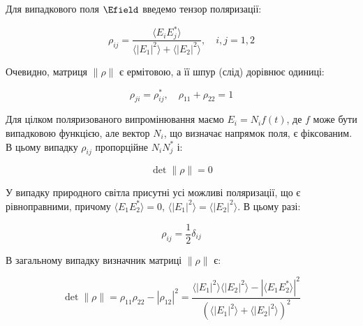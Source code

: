 Для випадкового поля \(\Efield\) введемо тензор поляризації:

\begin{equation}
	\rho_{ij} = \frac{\langle E_i E_j^{*} \rangle}{\langle |E_1|^2 \rangle + \langle |E_2|^2 \rangle}, \quad i, j = 1, 2
	\label{eq:polarization_tensor}
\end{equation}

Очевидно, матриця \( \|\rho\|\) є ермітовою, а її шпур (слід) дорівнює одиниці:

\begin{equation}\label{eq:hermitian}
	\rho_{ji} = \rho_{ij}^{*}, \quad \rho_{11} + \rho_{22} = 1
\end{equation}

Для цілком поляризованого випромінювання маємо \(E_i = N_i f(t)\), де \(f\) може бути випадковою функцією, але вектор
\(N_i\), що визначає напрямок поля, є фіксованим. В цьому випадку \(\rho_{ij}\) пропорційне \(N_i N_j^{*}\) і:

\begin{equation}
	\det \|\rho\| = 0
\end{equation}

У випадку природного світла присутні усі можливі поляризації, що є рівноправними, причому \(\langle E_1 E_2^{*} \rangle
= 0\), \(\langle |E_1|^2 \rangle = \langle |E_2|^2 \rangle\). В цьому разі:

\begin{equation*}
	\rho_{ij} = \frac{1}{2} \delta_{ij}
\end{equation*}

В загальному випадку визначник матриці \(\|\rho\|\) є:

\begin{equation*}
	\det \|\rho\| = \rho_{11} \rho_{22} - |\rho_{12}|^2 = \frac{\langle |E_1|^2 \rangle \langle |E_2|^2 \rangle - |\langle E_1 E_2^{*} \rangle|^2}{
		\left(\langle |E_1|^2 \rangle + \langle |E_2|^2 \rangle\right)^2}
\end{equation*}

